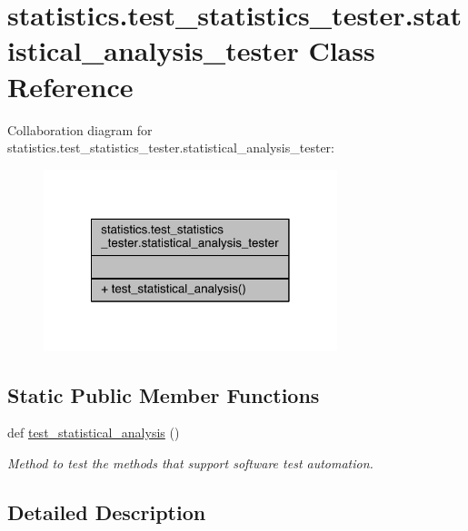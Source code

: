 \hypertarget{classstatistics_1_1test__statistics__tester_1_1statistical__analysis__tester}{}\section{statistics.\+test\+\_\+statistics\+\_\+tester.\+statistical\+\_\+analysis\+\_\+tester Class Reference}
\label{classstatistics_1_1test__statistics__tester_1_1statistical__analysis__tester}


Collaboration diagram for statistics.\+test\+\_\+statistics\+\_\+tester.\+statistical\+\_\+analysis\+\_\+tester\+:
\nopagebreak
\begin{figure}[H]
\begin{center}
\leavevmode
\includegraphics[width=242pt]{d2/d41/classstatistics_1_1test__statistics__tester_1_1statistical__analysis__tester__coll__graph}
\end{center}
\end{figure}
\subsection*{Static Public Member Functions}
\begin{DoxyCompactItemize}
\item 
def \hyperlink{classstatistics_1_1test__statistics__tester_1_1statistical__analysis__tester_ad05a0d6e83aaba083bfba6212ec0b971}{test\+\_\+statistical\+\_\+analysis} ()
\begin{DoxyCompactList}\small\item\em Method to test the methods that support software test automation. \end{DoxyCompactList}\end{DoxyCompactItemize}


\subsection{Detailed Description}



